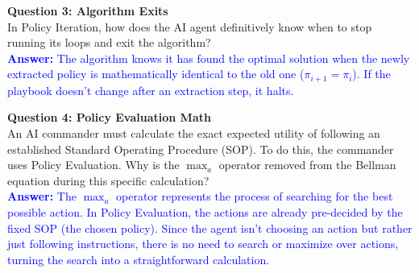 \documentclass[12pt]{article}
\begin{document}
\noindent \textbf{Question 3: Algorithm Exits} \\
In Policy Iteration, how does the AI agent definitively know when to stop running its loops and exit the algorithm?\\
\textcolor{blue}{\textbf{Answer:} The algorithm knows it has found the optimal solution when the newly extracted policy is mathematically identical to the old one ($\pi_{i+1} = \pi_i$). If the playbook doesn't change after an extraction step, it halts.}
\vspace{0.5cm}

\noindent \textbf{Question 4: Policy Evaluation Math} \\
An AI commander must calculate the exact expected utility of following an established Standard Operating Procedure (SOP). To do this, the commander uses Policy Evaluation. Why is the $\max_a$ operator removed from the Bellman equation during this specific calculation?\\
\textcolor{blue}{\textbf{Answer:} The $\max_a$ operator represents the process of searching for the best possible action. In Policy Evaluation, the actions are already pre-decided by the fixed SOP (the chosen policy). Since the agent isn't choosing an action but rather just following instructions, there is no need to search or maximize over actions, turning the search into a straightforward calculation.}
\end{document}
